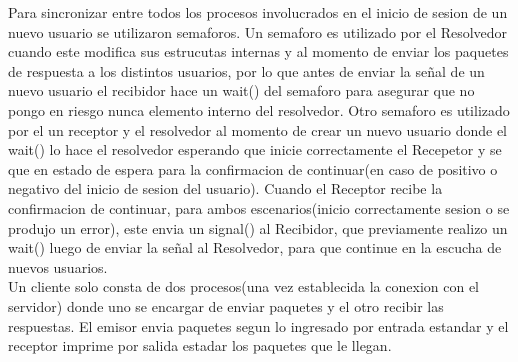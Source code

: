\documentclass[a4paper,12pt,titlepage]{article}
\begin{document}
Para sincronizar entre todos los procesos involucrados en el inicio de sesion de un nuevo usuario se utilizaron semaforos. Un semaforo es utilizado 
por el Resolvedor cuando este modifica sus estrucutas internas y al momento de enviar los paquetes de respuesta a los distintos usuarios, por lo 
que antes de enviar la señal de un nuevo usuario el recibidor hace un wait() del semaforo para asegurar que no pongo en riesgo nunca elemento interno 
del resolvedor. Otro semaforo es utilizado por el un receptor y el resolvedor al momento de crear un nuevo usuario donde el wait() lo hace el resolvedor 
esperando que inicie correctamente el Recepetor y se que en estado de espera para la confirmacion de continuar(en caso de positivo o negativo del inicio 
de sesion del usuario). Cuando el Receptor recibe la confirmacion de continuar, para ambos escenarios(inicio correctamente sesion o se produjo un error), 
este envia un signal() al Recibidor, que previamente realizo un wait() luego de enviar la señal al Resolvedor, para que continue en la escucha de nuevos usuarios.\\

Un cliente solo consta de dos procesos(una vez establecida la conexion con el servidor) donde uno se encargar de enviar paquetes y el otro recibir las respuestas. 
El emisor envia paquetes segun lo ingresado por entrada estandar y el receptor imprime por salida estadar los paquetes que le llegan.
\end{document}
